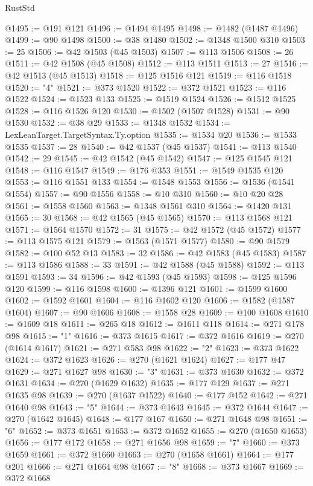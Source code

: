 \begin{lexlean}{RustStd}
\begin{coremodule}
@1495 := @191 @121
@1496 := @1494 @1495
@1498 := @1482 (@1487 @1496)
@1499 := @90 @1498
@1500 := @38 @1480
@1502 := @1348 @1500 @310
@1503 := 25
@1506 := @42 @1503 (@45 @1503)
@1507 := @113 @1506
@1508 := 26
@1511 := @42 @1508 (@45 @1508)
@1512 := @113 @1511
@1513 := 27
@1516 := @42 @1513 (@45 @1513)
@1518 := @125 @1516 @121
@1519 := @116 @1518
@1520 := "4"
@1521 := @373 @1520
@1522 := @372 @1521
@1523 := @116 @1522
@1524 := @1523 @133
@1525 := @1519 @1524
@1526 := @1512 @1525
@1528 := @116 @1526 @120
@1530 := @1502 (@1507 @1528)
@1531 := @90 @1530
@1532 := @38 @29
@1533 := @1348 @1532
@1534 := LexLeanTarget.TargetSyntax.Ty.option
@1535 := @1534 @20
@1536 := @1533 @1535
@1537 := 28
@1540 := @42 @1537 (@45 @1537)
@1541 := @113 @1540
@1542 := 29
@1545 := @42 @1542 (@45 @1542)
@1547 := @125 @1545 @121
@1548 := @116 @1547
@1549 := @176 @353
@1551 := @1549 @1535 @120
@1553 := @116 @1551 @133
@1554 := @1548 @1553
@1556 := @1536 (@1541 @1554)
@1557 := @90 @1556
@1558 := @10 @310
@1560 := @10 @20 @28
@1561 := @1558 @1560
@1563 := @1348 @1561 @310
@1564 := @1420 @131
@1565 := 30
@1568 := @42 @1565 (@45 @1565)
@1570 := @113 @1568 @121
@1571 := @1564 @1570
@1572 := 31
@1575 := @42 @1572 (@45 @1572)
@1577 := @113 @1575 @121
@1579 := @1563 (@1571 @1577)
@1580 := @90 @1579
@1582 := @100 @52 @13
@1583 := 32
@1586 := @42 @1583 (@45 @1583)
@1587 := @113 @1586
@1588 := 33
@1591 := @42 @1588 (@45 @1588)
@1592 := @113 @1591
@1593 := 34
@1596 := @42 @1593 (@45 @1593)
@1598 := @125 @1596 @120
@1599 := @116 @1598
@1600 := @1396 @121
@1601 := @1599 @1600
@1602 := @1592 @1601
@1604 := @116 @1602 @120
@1606 := @1582 (@1587 @1604)
@1607 := @90 @1606
@1608 := @1558 @28
@1609 := @100 @1608
@1610 := @1609 @18
@1611 := @265 @18
@1612 := @1611 @118
@1614 := @271 @178 @98
@1615 := "1"
@1616 := @373 @1615
@1617 := @372 @1616
@1619 := @270 (@1614 @1617)
@1621 := @271 @583 @98
@1622 := "2"
@1623 := @373 @1622
@1624 := @372 @1623
@1626 := @270 (@1621 @1624)
@1627 := @177 @47
@1629 := @271 @1627 @98
@1630 := "3"
@1631 := @373 @1630
@1632 := @372 @1631
@1634 := @270 (@1629 @1632)
@1635 := @177 @129
@1637 := @271 @1635 @98
@1639 := @270 (@1637 @1522)
@1640 := @177 @152
@1642 := @271 @1640 @98
@1643 := "5"
@1644 := @373 @1643
@1645 := @372 @1644
@1647 := @270 (@1642 @1645)
@1648 := @177 @167
@1650 := @271 @1648 @98
@1651 := "6"
@1652 := @373 @1651
@1653 := @372 @1652
@1655 := @270 (@1650 @1653)
@1656 := @177 @172
@1658 := @271 @1656 @98
@1659 := "7"
@1660 := @373 @1659
@1661 := @372 @1660
@1663 := @270 (@1658 @1661)
@1664 := @177 @201
@1666 := @271 @1664 @98
@1667 := "8"
@1668 := @373 @1667
@1669 := @372 @1668

\end{coremodule}
\end{lexlean}
